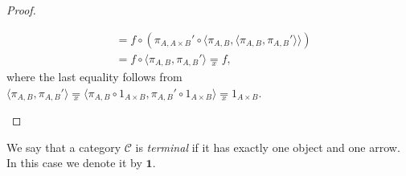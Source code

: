 \begin{proof}
\begin{itemize}
\begin{align*}
                                         &=f \circ (\pi_{A,A \times B}' \circ \langle \pi_{A,B}, \langle \pi_{A,B}, \pi_{A,B}' \rangle \rangle) \\
                                         &= f \circ \langle \pi_{A,B}, \pi_{A,B}' \rangle \underset{x}{=} f,
        \end{align*}
        where the last equality follows from $\langle \pi_{A,B}, \pi_{A,B}' \rangle \underset{x}{=} \langle \pi_{A,B} \circ 1_{A \times B}, \pi_{A,B}' \circ 1_{A \times B} \rangle \underset{x}{=} 1_{A \times B}$.
    \end{itemize}
\end{proof}

\begin{definition}
    We say that a category $\mathcal C$ is \emph{terminal} if it has exactly one object and one arrow. In this case we denote it by $\mathbf 1$.
\end{definition}

